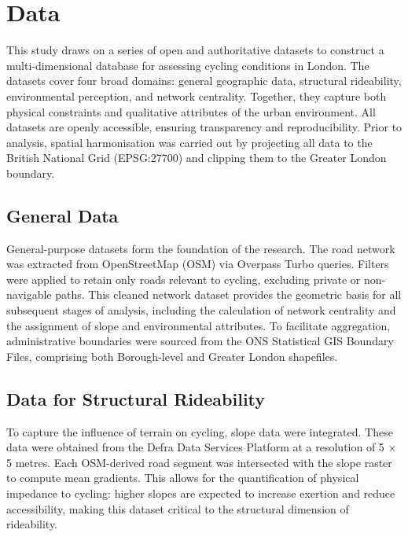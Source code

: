 \documentclass[
  12pt,
  oneside]{book}
\begin{document}
\section{Data}\label{data}

This study draws on a series of open and authoritative datasets to construct a multi-dimensional database for assessing cycling conditions in London. The datasets cover four broad domains: general geographic data, structural rideability, environmental perception, and network centrality. Together, they capture both physical constraints and qualitative attributes of the urban environment. All datasets are openly accessible, ensuring transparency and reproducibility. Prior to analysis, spatial harmonisation was carried out by projecting all data to the British National Grid (EPSG:27700) and clipping them to the Greater London boundary.

\subsection{General Data}\label{general-data}

General-purpose datasets form the foundation of the research. The road network was extracted from OpenStreetMap (OSM) via Overpass Turbo queries. Filters were applied to retain only roads relevant to cycling, excluding private or non-navigable paths. This cleaned network dataset provides the geometric basis for all subsequent stages of analysis, including the calculation of network centrality and the assignment of slope and environmental attributes. To facilitate aggregation, administrative boundaries were sourced from the ONS Statistical GIS Boundary Files, comprising both Borough-level and Greater London shapefiles.

\subsection{Data for Structural Rideability}\label{data-for-structural-rideability}

To capture the influence of terrain on cycling, slope data were integrated. These data were obtained from the Defra Data Services Platform at a resolution of 5 × 5 metres. Each OSM-derived road segment was intersected with the slope raster to compute mean gradients. This allows for the quantification of physical impedance to cycling: higher slopes are expected to increase exertion and reduce accessibility, making this dataset critical to the structural dimension of rideability.
\end{document}
